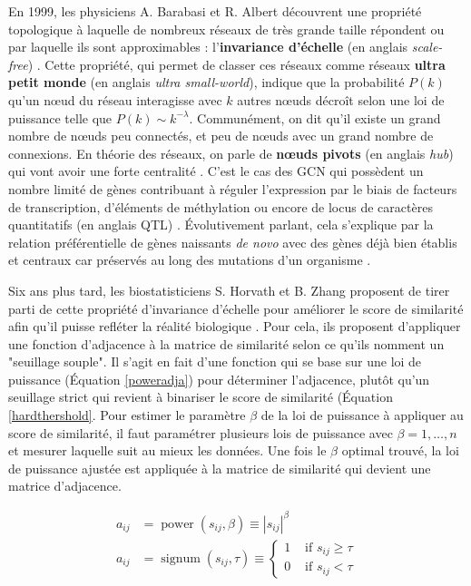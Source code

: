 En 1999, les physiciens A. Barabasi et R. Albert découvrent une propriété topologique à laquelle de nombreux réseaux de très grande taille répondent ou par laquelle ils sont approximables \cite{Broido2019Mar} : l'\textbf{invariance d'échelle} (en anglais \textit{scale-free}) \cite{Barabasi1999Oct}. Cette propriété, qui permet de classer ces réseaux comme réseaux \textbf{ultra petit monde} \cite{Cohen2003Feb} (en anglais \textit{ultra small-world}), indique que la probabilité $P(k)$ qu'un nœud du réseau interagisse avec $k$ autres nœuds décroît selon une loi de puissance telle que $P(k) \sim k^{-\lambda}$. Communément, on dit qu'il existe un grand nombre de nœuds peu connectés, et peu de nœuds avec un grand nombre de connexions. En théorie des réseaux, on parle de \textbf{nœuds pivots} (en anglais \textit{hub}) qui vont avoir une forte centralité \cite{VanDam2018}. C'est le cas des \acrshort{GCN} qui possèdent un nombre limité de gènes contribuant à réguler l'expression par le biais de facteurs de transcription, d'éléments de méthylation ou encore de locus de caractères quantitatifs (en anglais \acrfull{QTL}) \cite{Serin2016}. Évolutivement parlant, cela s'explique par la relation préférentielle de gènes naissants \textit{de novo} avec des gènes déjà bien établis et centraux car préservés au long des mutations d'un organisme \cite{Barabasi2004}.


Six ans plus tard, les biostatisticiens S. Horvath et B. Zhang proposent de tirer parti de cette propriété d'invariance d'échelle pour améliorer le score de similarité afin qu'il puisse refléter la réalité biologique \cite{Zhang2005a}. Pour cela, ils proposent d'appliquer une fonction d'adjacence à la matrice de similarité selon ce qu'ils nomment un "seuillage souple". Il s'agit en fait d'une fonction qui se base sur une loi de puissance (Équation \ref{poweradja}) pour déterminer l'adjacence, plutôt qu'un seuillage strict qui revient à binariser le score de similarité (Équation \ref{hardthershold}. Pour estimer le paramètre $\beta$ de la loi de puissance à appliquer au score de similarité, il faut paramétrer plusieurs lois de puissance avec $\beta = 1, \dots, n$ et mesurer laquelle suit au mieux les données. Une fois le $\beta$ optimal trouvé, la loi de puissance ajustée est appliquée à la matrice de similarité qui devient une matrice d'adjacence. 

\begin{align} 
    a_{i j} &= \operatorname{power}\left(s_{i j}, \beta\right) \equiv\left|s_{i j}\right|^{\beta} \label{poweradja} \\
    a_{i j} &= \operatorname{signum}\left(s_{i j}, \tau\right) \equiv \begin{cases}1 & \text { if } s_{i j} \geq \tau \\ 0 & \text { if } s_{i j}<\tau\end{cases} \label{hardthershold}
\end{align}

